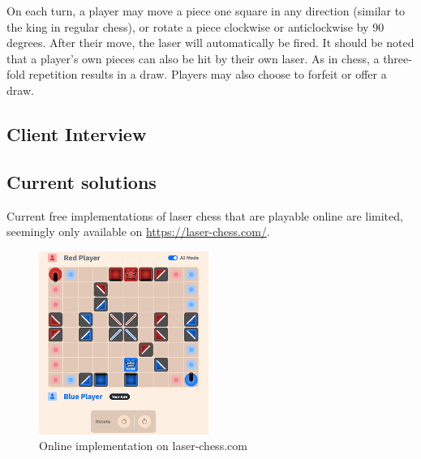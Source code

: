 \documentclass{article}
\begin{document}
On each turn, a player may move a piece one square in any direction (similar to the king in regular chess), or rotate a piece clockwise or anticlockwise by 90 degrees. After their move, the laser will automatically be fired. It should be noted that a player’s own pieces can also be hit by their own laser. As in chess, a three-fold repetition results in a draw. Players may also choose to forfeit or offer a draw.

\subsection{Client Interview}

\subsection{Current solutions}
Current free implementations of laser chess that are playable online are limited, seemingly only available on \url{https://laser-chess.com/}.

\begin{figure}
    \includegraphics[width=\linewidth]{assets/laserchesscom.png}
    \caption{Online implementation on laser-chess.com}
    \label{fig:laserchesscom}
\end{figure}
\end{document}
